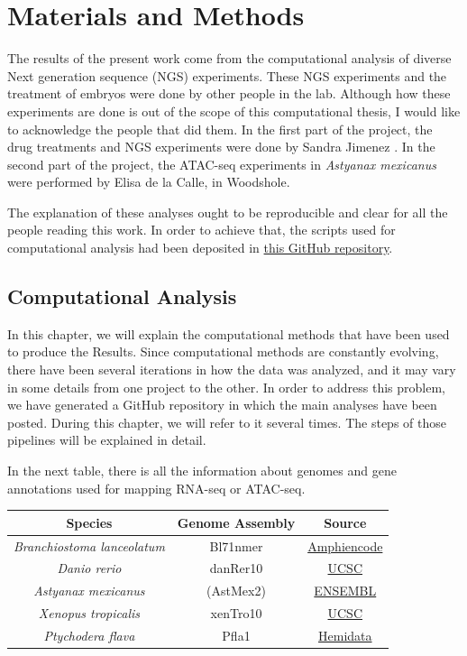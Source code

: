 \part{Materials and Methods}

The results of the present work come from the computational analysis of diverse Next generation sequence (NGS) experiments. These NGS experiments and the treatment of embryos were done by other people in the lab. Although how these experiments are done is out of the scope of this computational thesis, I would like to acknowledge the people that did them. In the first part of the project, the drug treatments and NGS experiments were done by Sandra Jimenez \parencite{magri_assaying_2020}. In the second part of the project, the ATAC-seq experiments in \textit{Astyanax mexicanus} were performed by Elisa de la Calle, in Woodshole.

The explanation of these analyses ought to be reproducible and clear for all the people reading this work. In order to achieve that, the scripts used for computational analysis had been deposited in \href{https://github.com/alexgilgal/Thesis_methods}{this GitHub repository}.


\chapter{Computational Analysis}

In this chapter, we will explain the computational methods that have been used to produce the Results. Since computational methods are constantly evolving, there have been several iterations in how the data was analyzed, and it may vary in some details from one project to the other. In order to address this problem, we have generated a GitHub repository in which the main analyses have been posted. During this chapter, we will refer to it several times. The steps of those pipelines will be explained in detail. 

In the next table, there is all the information about genomes and gene annotations used for mapping RNA-seq or ATAC-seq.

\begin{center}
\begin{tabular}{ |c|c|c| } 
 \hline
 Species & Genome Assembly & Source \\
 \hline
 \textit{Branchiostoma lanceolatum} & Bl71nmer & \href{http://amphiencode.github.io}{Amphiencode }\\ 
 \textit{Danio rerio} & danRer10 & \href{http://hgdownload.soe.ucsc.edu/goldenPath/danRer10/bigZips/}{UCSC} \\
 \textit{Astyanax mexicanus} &  (AstMex2) & \href{http://Feb2023.archive.ensembl.org/Astyanax_mexicanus/Info/Index}{ENSEMBL}\\
 \textit{Xenopus tropicalis} & xenTro10 & \href{http://hgdownload.soe.ucsc.edu/goldenPath/xenTro10/bigZips/}{UCSC}\\
 \textit{Ptychodera flava} & Pfla1 & \href{http://octopus.unit.oist.jp/HEMIDATA/pfl.genes.gff3.gz}{Hemidata}\\
 \hline
\end{tabular}
\end{center}

